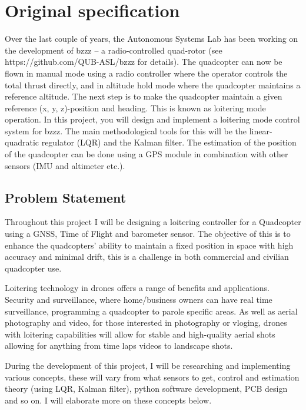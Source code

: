 \documentclass{article}
\begin{document}
\section*{Original specification}
Over the last couple of years, the Autonomous Systems Lab has been working on the
development of bzzz – a radio-controlled quad-rotor (see https://github.com/QUB-ASL/bzzz
for details). The quadcopter can now be flown in manual mode using a radio controller where
the operator controls the total thrust directly, and in altitude hold mode where the quadcopter
maintains a reference altitude. The next step is to make the quadcopter maintain a given
reference (x, y, z)-position and heading. This is known as loitering mode operation.
In this project, you will design and implement a loitering mode control system for bzzz.
The main methodological tools for this will be the linear-quadratic regulator (LQR) and the Kalman filter. The
estimation of the position of the quadcopter can be done using a GPS module in combination with other sensors
(IMU and altimeter etc.).
\subsection*{Problem Statement}
Throughout this project I will be designing a loitering controller for a Quadcopter using a GNSS, Time of Flight and barometer
sensor. The objective of this is to enhance the quadcopters’ ability to maintain a fixed position in space with high accuracy and
minimal drift, this is a challenge in both commercial and civilian quadcopter use.

Loitering technology in drones offers a range of benefits and applications. Security and surveillance, where home/business owners can have real time surveillance, programming a quadcopter to parole specific areas. As well as aerial photography and video, for those interested in photography or vloging, drones with loitering capabilities will allow for stable and high-quality aerial shots allowing for anything from time laps videos to landscape shots.

During the development of this project, I will be researching and implementing various concepts, these will vary from what 
sensors to get, control and estimation theory (using LQR, Kalman filter), python software development, PCB design and so on.
I will elaborate more on these concepts below.

\newpage
\end{document}
